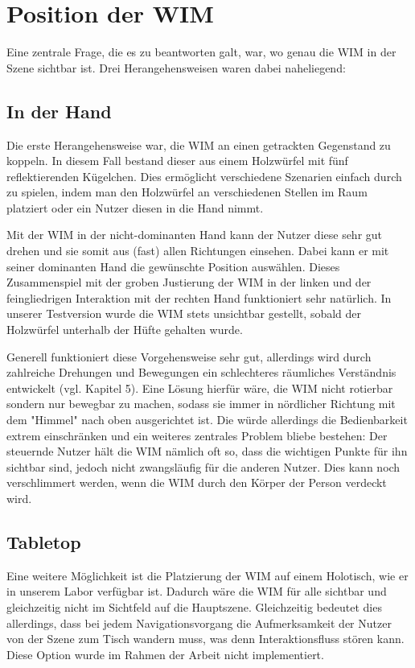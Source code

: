 \section{Position der WIM}
Eine zentrale Frage, die es zu beantworten galt, war, wo genau die WIM in der Szene sichtbar ist. Drei Herangehensweisen waren dabei naheliegend:

\subsection{In der Hand}
Die erste Herangehensweise war, die WIM an einen getrackten Gegenstand zu koppeln. In diesem Fall bestand dieser aus einem Holzwürfel mit fünf reflektierenden Kügelchen.
Dies ermöglicht verschiedene Szenarien einfach durch zu spielen, indem man den Holzwürfel an verschiedenen Stellen im Raum platziert oder ein Nutzer diesen in die Hand nimmt.

Mit der WIM in der nicht-dominanten Hand kann der Nutzer diese sehr gut drehen und sie somit aus (fast) allen Richtungen einsehen. Dabei kann er mit seiner dominanten Hand die gewünschte Position auswählen. Dieses Zusammenspiel mit der groben Justierung der WIM in der linken und der feingliedrigen Interaktion mit der rechten Hand funktioniert sehr natürlich.
In unserer Testversion wurde die WIM stets unsichtbar gestellt, sobald der Holzwürfel unterhalb der Hüfte gehalten wurde.

Generell funktioniert diese Vorgehensweise sehr gut, allerdings wird durch zahlreiche Drehungen und Bewegungen ein schlechteres räumliches Verständnis entwickelt (vgl. Kapitel 5). Eine Lösung hierfür wäre, die WIM nicht rotierbar sondern nur bewegbar zu machen, sodass sie immer in nördlicher Richtung mit dem "Himmel" nach oben ausgerichtet ist. Die würde allerdings die Bedienbarkeit extrem einschränken und ein weiteres zentrales Problem bliebe bestehen:
Der steuernde Nutzer hält die WIM nämlich oft so, dass die wichtigen Punkte für ihn sichtbar sind, jedoch nicht zwangsläufig für die anderen Nutzer. Dies kann noch verschlimmert werden, wenn die WIM durch den Körper der Person verdeckt wird.


\subsection{Tabletop}
Eine weitere Möglichkeit ist die Platzierung der WIM auf einem Holotisch, wie er in unserem Labor verfügbar ist.
Dadurch wäre die WIM für alle sichtbar und gleichzeitig nicht im Sichtfeld auf die Hauptszene. Gleichzeitig bedeutet dies allerdings, dass bei jedem Navigationsvorgang die Aufmerksamkeit der Nutzer von der Szene zum Tisch wandern muss, was denn Interaktionsfluss stören kann. Diese Option wurde im Rahmen der Arbeit nicht implementiert.

